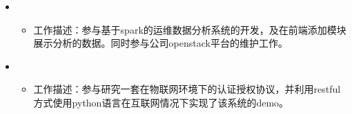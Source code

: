   \begin{itemize}[leftmargin=*]
    \item
      {\small
      \begin{itemize}
        \item 工作描述：参与基于spark的运维数据分析系统的开发，及在前端添加模块展示分析的数据。同时参与公司openstack平台的维护工作。
      \end{itemize}
      }
  \end{itemize}
  \begin{itemize}[leftmargin=*]
  	\item
  	{\small
  		\begin{itemize}
  			\item 工作描述：参与研究一套在物联网环境下的认证授权协议，并利用restful方式使用python语言在互联网情况下实现了该系统的demo。
  		\end{itemize}
  	}
  \end{itemize}